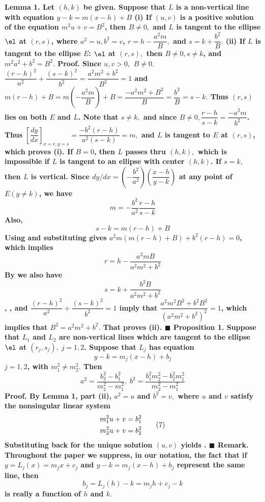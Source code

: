 \nl \bf Lemma 1. \rm Let $(h,k)$ be given. Suppose that $L$ is a non-vertical line with equation 
$y-k=m(x-h)+B$\nl
(i) If $(u,v)$ is a \bf positive \rm solution of the equation $m^{2}u+v=B^{2}$, then $B\neq 0,$ and $L$ is tangent to the ellipse $\el$ at $(r,s)$, where $a^{2}=u,b^{2}=v$, $r=h-\dfrac{a^{2}m}{B},$ and $s=k+\dfrac{b^{2}}{B}.$ \nl 
(ii) If $L$ is tangent to the ellipse $E$: $\el$ at $(r,s),$ then $B\neq 0,s\neq k$, and $m^{2}a^{2}+b^{2}=B^{2}.$ \nl
\bf Proof. \rm Since $u,v>0,$ $B\neq 0.$ $\dfrac{(r-h)^{2}}{a^{2}}+\dfrac{(s-k)^{2}}{b^{2}}=\dfrac{a^{2}m^{2}+b^{2}}{B^{2}}=1$ and $m(r-h)+B=m\left( -\dfrac{a^{2}m}{B}\right) +B=\dfrac{-a^{2}m^{2}+B^{2}}{B}=\dfrac{b^{2}}{B}=s-k.$ Thus $(r,s)$ lies on both $E$ and $L$. Note that $s\neq k,$ and since $B\neq 0,\dfrac{r-h}{s-k}=\dfrac{-a^{2}m}{b^{2}}$. Thus $\left[ \dfrac{dy}{dx}\right] _{x=r,y=s}=\dfrac{-b^{2}(r-h)}{a^{2}(s-k)}=m,$ and $L$ is tangent to $E$ at $(r,s)$, which proves (i). If $B=0$, then $L$ passes thru $(h,k),$ which is impossible if $L$ is tangent to an ellipse with center $(h,k)$. If $s=k,$ then $L$ is vertical. Since $dy/dx=\left( -\dfrac{b^{2}}{a^{2}}\right) \left( \dfrac{x-h}{y-k}\right)$ at any point of $E(y\neq k)$, we have 
$$m=-\dfrac{b^{2}}{a^{2}}\frac{r-h}{s-k}\tag{1}$$ Also, $$s-k=m(r-h)+B\tag{2}$$ Using  and substituting   gives $a^{2}m\left(m(r-h)+B\right) +b^{2}(r-h)=0$, which implies $$r=h-\frac{a^{2}mB}{a^{2}m^{2}+b^{2}}\tag{3}$$ By  we also have $$s=k+\frac{b^{2}B}{a^{2}m^{2}+b^{2}}\tag{4}$$ , , and $\dfrac{(r-h)^{2}}{a^{2}}+\dfrac{(s-k)^{2}}{b^{2}}=1$ imply that 
$\dfrac{a^{2}m^{2}B^{2}+b^{2}B^{2}}{(a^{2}m^{2}+b^{2})^{2}}=1$, which implies that 
$B^{2}=a^{2}m^{2}+b^{2}.$ That proves (ii).  $\blacksquare$ \nl \nl
\nl \bf Proposition 1. \rm Suppose that $L_{1}$ and $L_{2}$ are non-vertical lines which are tangent to the ellipse $\el$ at $(r_{j},s_{j}),\;j=1,2$. Suppose that $L_{j}$ has equation 
$$y-k=m_{j}(x-h)+b_{j}\tag{5}$$ $j=1,2$, with $m_{1}^{2}\neq m_{2}^{2}.$ Then 
$$a^{2}=\dfrac{b_{2}^{2}-b_{1}^{2}}{m_{2}^{2}-m_{1}^{2}},\;b^{2}=\dfrac{b_{1}^{2}m_{2}^{2}-b_{2}^{2}m_{1}^{2}}{m_{2}^{2}-m_{1}^{2}}\tag{6}$$
\nl \bf Proof. \rm By Lemma 1, part (ii), $a^{2}=u$ and $b^{2}=v,$ where $u$ and $v$ satisfy the \bf nonsingular \rm linear system 
$$\split
m_{1}^{2}u+v=b_{1}^{2}\\
m_{2}^{2}u+v=b_{2}^{2}\endsplit\tag{7}$$
Substituting back for the unique solution $(u,v)$ yields . $\blacksquare$ 
\nl \bf Remark. \rm Throughout the paper we suppress, in our notation, the fact that if $y=L_{j}(x)=m_{j}x+c_{j}$ and $y-k=m_{j}(x-h)+b_{j}$ represent the same line, then $$b_{j}=L_{j}(h)-k=m_{j}h+c_{j}-k\tag{8}$$ is really a function of $h$ and $k.$ \nl \nl
